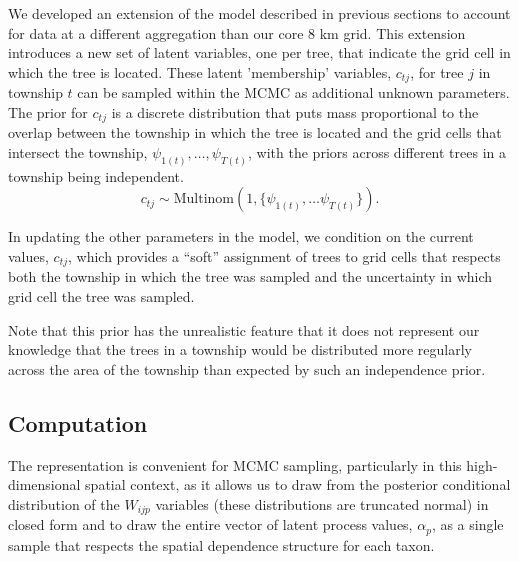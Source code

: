\documentclass[12pt]{article}\usepackage[]{graphicx}\usepackage[]{color}
\begin{document}
We developed an extension of the model described in previous sections
to account for data at a different aggregation than our core 8 km
grid. This extension introduces a new set of latent variables, one
per tree, that indicate the grid cell in which the tree is located.
These latent 'membership' variables, $c_{tj}$, for tree $j$ in township
$t$ can be sampled within the MCMC as additional unknown parameters.
The prior for $c_{tj}$ is a discrete distribution that puts mass
proportional to the overlap between the township in which the tree
is located and the grid cells that intersect the township, $\psi_{1(t)},\ldots,\psi_{T(t)}$,
with the priors across different trees in a township being independent.
\[
c_{tj}\sim\mbox{Multinom}(1,\{\psi_{1(t)},\ldots\psi_{T(t)}\}).
\]


In updating the other parameters in the model, we condition on the
current values, $c_{tj}$, which provides a ``soft'' assignment
of trees to grid cells that respects both the township in which the
tree was sampled and the uncertainty in which grid cell the tree was
sampled.

Note that this prior has the unrealistic feature that it does not
represent our knowledge that the trees in a township would be distributed
more regularly across the area of the township than expected by such
an independence prior.


\subsection{Computation}

The \cite{McCu:Ross:1994} representation is convenient for MCMC sampling,
particularly in this high-dimensional spatial context, as it allows
us to draw from the posterior conditional distribution of the $W_{ijp}$
variables (these distributions are truncated normal) in closed form
and to draw the entire vector of latent process values, $\alpha_{p}$,
as a single sample that respects the spatial dependence structure
for each taxon.
\end{document}
